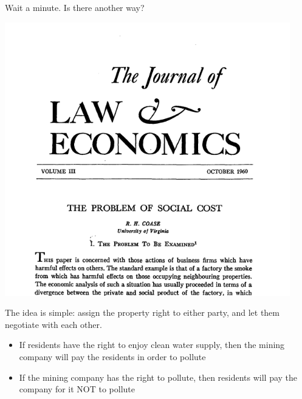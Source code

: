 \begin{frame}{}
\protect\hypertarget{section-9}{}

Wait a minute. Is there another way?

\end{frame}

\begin{frame}{}
\protect\hypertarget{section-10}{}

\includegraphics[width=\textwidth,height=4.6875in]{figures/m4_the_problem_of_social_cost.png}

\end{frame}

\begin{frame}{}
\protect\hypertarget{section-11}{}

The idea is simple: assign the property right to either party, and let
them negotiate with each other.

\begin{itemize}
\tightlist
\item
  If residents have the right to enjoy clean water supply, then the
  mining company will pay the residents in order to pollute
\item
  If the mining company has the right to pollute, then residents will
  pay the company for it NOT to pollute
\end{itemize}

\end{frame}

